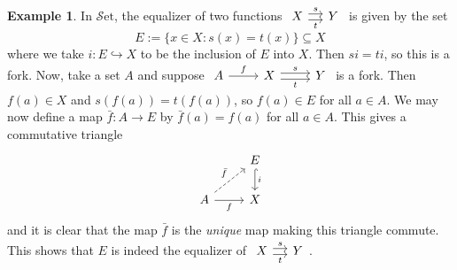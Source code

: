 \documentclass[10pt,oneside]{book}
\def\~#1{\mathscr{#1}}
\newcommand{\mono}{\hookrightarrow}
\newcommand{\Set}{\~S\mathrm{et}}
\theoremstyle{plain}
\theoremstyle{definition}
\newtheorem{ex}[thm]{Example}
\theoremstyle{remark}
\numberwithin{equation}{section}
\numberwithin{figure}{section}
\begin{document}
\begin{ex}
In $\Set$, the equalizer of two functions $\begin{tikzcd}[column sep = small]
        X & Y
        \arrow["t"', shift right, from=1-1, to=1-2]
        \arrow["s", shift left, from=1-1, to=1-2]
    \end{tikzcd}$ is given by the set
\[E := \{x \in X : s(x) = t(x)\} \subseteq X\]
where we take $i: E \mono X$ to be the inclusion of $E$ into $X$. Then $si  = ti$, so this is a fork. Now, take a set $A$ and suppose $\begin{tikzcd}
            A & X & Y
            \arrow["f", from=1-1, to=1-2]
            \arrow["t"', shift right, from=1-2, to=1-3]
            \arrow["s", shift left, from=1-2, to=1-3]
        \end{tikzcd}$ is a fork. Then $f(a) \in X$ and $s(f(a)) = t(f(a))$, so $f(a) \in E$ for all $a \in A$. We may now define a map $\bar{f}: A \to E$ by $\bar{f}(a) = f(a)$ for all $a \in A$. This gives a commutative triangle 
        \[\begin{tikzcd}
            & E \\
            A & X
            \arrow["f"', from=2-1, to=2-2]
            \arrow["{\bar{f}}", dashed, from=2-1, to=1-2]
            \arrow["i", from=1-2, to=2-2, hook]
        \end{tikzcd}\]   
        and it is clear that the map $\bar{f}$ is the \emph{unique} map making this triangle commute. This shows that $E$ is indeed the equalizer of $\begin{tikzcd}[column sep = small]
        X & Y
        \arrow["t"', shift right, from=1-1, to=1-2]
        \arrow["s", shift left, from=1-1, to=1-2]
    \end{tikzcd}$.
\end{ex}
\end{document}
